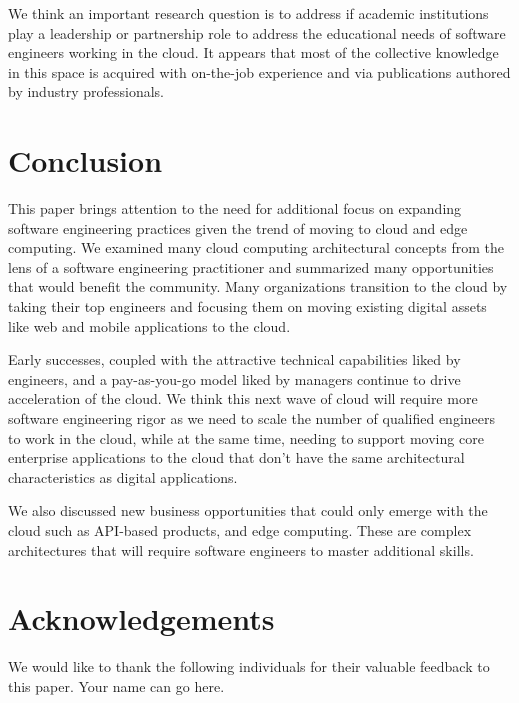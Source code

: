 \documentclass[conference]{IEEEtran}
\begin{document}
We think an important research question is to address if academic institutions play a leadership or partnership role to address the educational needs of software engineers working in the cloud.  It appears that most of the collective knowledge in this space is acquired with on-the-job experience and via publications authored by industry professionals.  

\section{Conclusion}
This paper brings attention to the need for additional focus on expanding software engineering practices given the trend of moving to cloud and edge computing.  We examined many cloud computing architectural concepts from the lens of a software engineering practitioner and summarized many opportunities that would benefit the community. Many organizations transition to the cloud by taking their top engineers and focusing them on moving existing digital assets like web and mobile applications to the cloud.

Early successes, coupled with the attractive technical capabilities liked by engineers, and a pay-as-you-go model liked by managers continue to drive acceleration of the cloud.  We think this next wave of cloud will require more software engineering rigor as we need to scale the number of qualified engineers to work in the cloud, while at the same time, needing to support moving core enterprise applications to the cloud that don't have the same architectural characteristics as digital applications. 

We also discussed new business opportunities that could only emerge with the cloud such as API-based products, and edge computing.  These are complex architectures that will require software engineers to master additional skills.

\section{Acknowledgements}
We would like to thank the following individuals for their valuable feedback to this paper. Your name can go here. 



\iffalse
\vspace{1cm}
\end{document}
